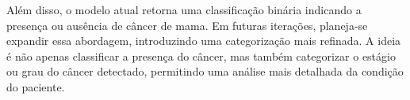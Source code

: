 Além disso, o modelo atual retorna uma classificação binária indicando a presença ou ausência de câncer de mama. Em futuras iterações, planeja-se expandir essa abordagem, introduzindo uma categorização mais refinada. A ideia é não apenas classificar a presença do câncer, mas também categorizar o estágio ou grau do câncer detectado, permitindo uma análise mais detalhada da condição do paciente.



